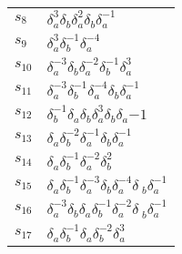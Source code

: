 \documentclass{article}
\begin{document}
\begin{center}
\begin{tabular}{ll}
$s_{8}$ & $\delta_a^{3}\delta_b^{}\delta_a^{2}\delta_b^{}\delta_a^{-1}$ \\
$s_{9}$ & $\delta_a^{3}\delta_b^{-1}\delta_a^{-4}$ \\
$s_{10}$ & $\delta_a^{-3}\delta_b^{}\delta_a^{-2}\delta_b^{-1}\delta_a^{3}$ \\
$s_{11}$ & $\delta_a^{-3}\delta_b^{-1}\delta_a^{-4}\delta_b^{}\delta_a^{-1}$ \\
$s_{12}$ & $\delta_b^{-1}\delta_a^{}\delta_b^{}\delta_a^{3}\delta_b^{}\delta_a^\
{-1}$ \\
$s_{13}$ & $\delta_a^{}\delta_b^{-2}\delta_a^{-1}\delta_b^{}\delta_a^{-1}$ \\
$s_{14}$ & $\delta_a^{}\delta_b^{-1}\delta_a^{-2}\delta_b^{2}$ \\
$s_{15}$ & $\delta_a^{}\delta_b^{-1}\delta_a^{-3}\delta_b^{}\delta_a^{-4}\delta\
_b^{}\delta_a^{-1}$ \\
$s_{16}$ & $\delta_a^{-3}\delta_b^{}\delta_a^{}\delta_b^{-1}\delta_a^{-2}\delta\
_b^{}\delta_a^{-1}$ \\
$s_{17}$ & $\delta_a^{}\delta_b^{-1}\delta_a^{}\delta_b^{-2}\delta_a^{3}$ \\
\bottomrule
\end{tabular}
\end{center}

\thispagestyle{empty}
\end{document}
